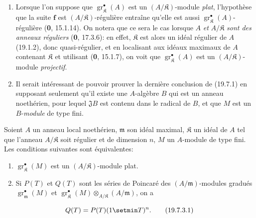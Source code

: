 \begin{remarks}[19.7.2]
\label{IV.19.7.2}
\begin{enumerate}
  \item[(i)] Lorsque l'on suppose que $\operatorname{gr}_{\mathfrak K}^\bullet(A)$ est un $(A/\mathfrak K)$-module \emph{plat}, l'hypothèse que la suite $\mathbf f$ est $(A/\mathfrak K)$-régulière entraîne qu'elle est aussi $\operatorname{gr}_{\mathfrak K}^\bullet(A)$-régulière (\textbf{0}, 15.1.14). On notera que ce sera le cas lorsque $A$ \emph{et} $A/\mathfrak K$ \emph{sont des anneaux réguliers} (\textbf{0}, 17.3.6): en effet, $\mathfrak K$ est alors un idéal régulier de $A$ (19.1.2), donc quasi-régulier, et en localisant aux idéaux maximaux de $A$ contenant $\mathfrak K$ et utilisant (\textbf{0}, 15.1.7), on voit que $\operatorname{gr}_{\mathfrak K}^\bullet(A)$ est un $(A/\mathfrak K)$-module \emph{projectif}.
  \item[(ii)] Il serait intéressant de pouvoir prouver la dernière conclusion de (19.7.1) en supposant seulement qu'il existe une $A$-algèbre $B$ qui est un anneau noethérien, pour lequel $\mathfrak JB$ est contenu dans le radical de $B$, et que $M$ est un $B$-\emph{module} de type fini.
\end{enumerate}
\end{remarks}

\begin{corollary}[19.7.3]
\label{IV.19.7.3}
Soient $A$ un anneau local noethérien, $\mathfrak m$ son idéal maximal, $\mathfrak K$ un idéal de $A$ tel que l'anneau $A/\mathfrak K$ soit régulier et de dimension $n$, $M$ un $A$-module de type fini. Les conditions suivantes sont équivalentes:
\begin{enumerate}
  \item[\textup{a)}] $\operatorname{gr}_{\mathfrak K}^\bullet(M)$ est un $(A/\mathfrak K)$-module plat.
  \item[\textup{b)}] Si $P(T)$ et $Q(T)$ sont les séries de Poincaré des $(A/\mathfrak m)$-modules gradués $\operatorname{gr}_{\mathfrak m}^\bullet(M)$ et $\operatorname{gr}_{\mathfrak K}^\bullet(M)\otimes_{A/\mathfrak K}(A/\mathfrak m)$, on a
\end{enumerate}
\begin{equation}
  Q(T)=P(T)(1\setmin T)^n.
  \tag{19.7.3.1}\label{IV.19.7.3.1}
\end{equation}
\end{corollary}

